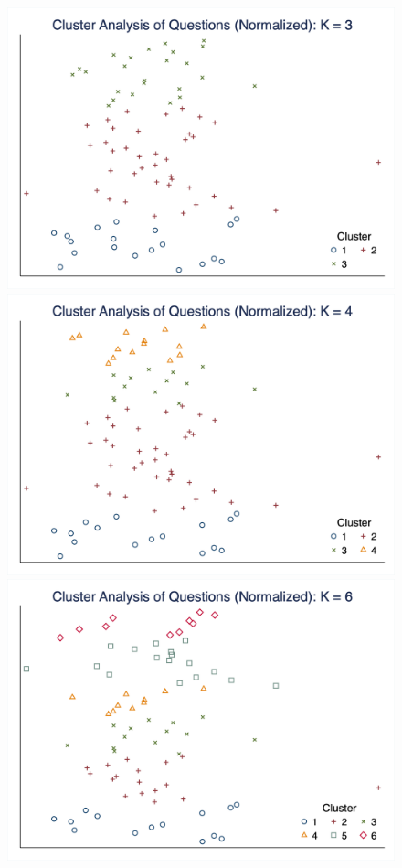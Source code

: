 \documentclass[10pt,leqno]{article}
\begin{document}
\begin{figure}  [h!]
\begin{center}
\includegraphics[scale=0.15]{CA_QuestionK3_NOR.png}
\includegraphics[scale=0.15]{CA_QuestionK4_NOR.png}
\includegraphics[scale=0.15]{CA_QuestionK6_NOR.png}

\end{center}
\end{figure}
\end{document}
